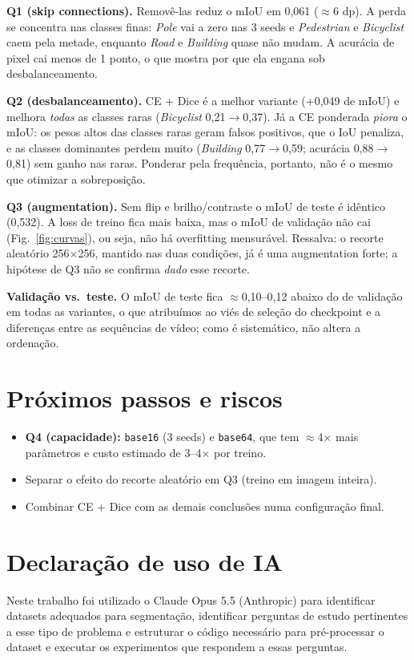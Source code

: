 \documentclass[10pt,a4paper,twocolumn]{article}
\begin{document}
\textbf{Q1 (skip connections).} Removê-las reduz o mIoU em 0,061 ($\approx$6 dp). A
perda se concentra nas classes finas: \emph{Pole} vai a zero nas 3 seeds e
\emph{Pedestrian} e \emph{Bicyclist} caem pela metade, enquanto \emph{Road} e
\emph{Building} quase não mudam. A acurácia de pixel cai menos de 1 ponto, o que
mostra por que ela engana sob desbalanceamento.

\textbf{Q2 (desbalanceamento).} CE + Dice é a melhor variante (+0,049 de mIoU) e
melhora \emph{todas} as classes raras (\emph{Bicyclist} 0,21$\rightarrow$0,37). Já a
CE ponderada \emph{piora} o mIoU: os pesos altos das classes raras geram falsos
positivos, que o IoU penaliza, e as classes dominantes perdem muito (\emph{Building}
0,77$\rightarrow$0,59; acurácia 0,88$\rightarrow$0,81) sem ganho nas raras.
Ponderar pela frequência, portanto, não é o mesmo que otimizar a sobreposição.

\textbf{Q3 (augmentation).} Sem flip e brilho/contraste o mIoU de teste é idêntico
(0,532). A loss de treino fica mais baixa, mas o mIoU de validação não cai
(Fig.~\ref{fig:curvas}), ou seja, não há overfitting mensurável. Ressalva: o recorte
aleatório 256$\times$256, mantido nas duas condições, já é uma augmentation forte;
a hipótese de Q3 não se confirma \emph{dado} esse recorte.

\textbf{Validação vs.\ teste.} O mIoU de teste fica $\approx$0,10--0,12 abaixo do de
validação em todas as variantes, o que atribuímos ao viés de seleção do checkpoint e a
diferenças entre as sequências de vídeo; como é sistemático, não altera a ordenação.

\section{Próximos passos e riscos}
\begin{itemize}
  \item \textbf{Q4 (capacidade):} \texttt{base16} (3 seeds) e \texttt{base64}, que tem
  $\approx$4$\times$ mais parâmetros e custo estimado de 3--4$\times$ por treino.
  \item Separar o efeito do recorte aleatório em Q3 (treino em imagem inteira).
  \item Combinar CE + Dice com as demais conclusões numa configuração final.
\end{itemize}

\section{Declaração de uso de IA}
Neste trabalho foi utilizado o Claude Opus 5.5 (Anthropic) para identificar datasets
adequados para segmentação, identificar perguntas de estudo pertinentes a esse tipo de
problema e estruturar o código necessário para pré-processar o dataset e executar os
experimentos que respondem a essas perguntas.
\end{document}
